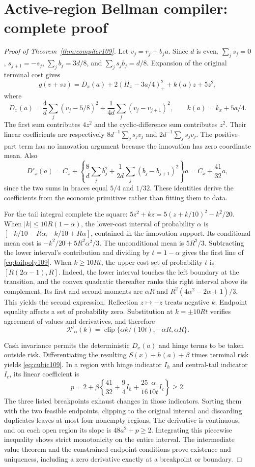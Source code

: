 \section{Active-region Bellman compiler: complete proof}\label{supp:compiler109}
\begin{proof}[Proof of Theorem~\ref{thm:compiler109}]
Let $v_j=r_j+b_ja$. Since $d$ is even, $\sum_js_j=0$, $s_{j+1}=-s_j$, $\sum_jb_j=3d/8$, and $\sum_js_jb_j=d/8$. Expansion of the original terminal cost gives
\[
 g(v+sz)=D_x(a)+2(H_x-3a/4)_+^2+k(a)z+5z^2,
\]
where
\[
 D_x(a)=\frac4d\sum_j(v_j-5/8)^2+\frac1{4d}\sum_j(v_j-v_{j+1})^2,
 \qquad k(a)=k_x+5a/4.
\]
The first sum contributes $4z^2$ and the cyclic-difference sum contributes $z^2$. Their linear coefficients are respectively $8d^{-1}\sum_js_jv_j$ and $2d^{-1}\sum_js_jv_j$. The positive-part term has no innovation argument because the innovation has zero coordinate mean. Also
\[
 D'_x(a)=C_x+\left\{\frac8d\sum_jb_j^2+\frac1{2d}\sum_j(b_j-b_{j+1})^2\right\}a
 =C_x+\frac{41}{32}a,
\]
since the two sums in braces equal $5/4$ and $1/32$. These identities derive the coefficients from the economic primitives rather than fitting them to data.

For the tail integral complete the square:
$5z^2+kz=5(z+k/10)^2-k^2/20$. When $|k|\le10R(1-\alpha)$, the lower-cost interval of probability $\alpha$ is
$[-k/10-R\alpha,-k/10+R\alpha]$, contained in the innovation support. Its conditional mean cost is $-k^2/20+5R^2\alpha^2/3$. The unconditional mean is $5R^2/3$. Subtracting the lower interval's contribution and dividing by $t=1-\alpha$ gives the first line of \eqref{eq:tailpoly109}. When $k\ge10Rt$, the upper-cost set of probability $t$ is $[R(2\alpha-1),R]$. Indeed, the lower interval touches the left boundary at the transition, and the convex quadratic thereafter ranks this right interval above its complement. Its first and second moments are $\alpha R$ and $R^2(4\alpha^2-2\alpha+1)/3$. This yields the second expression. Reflection $z\mapsto-z$ treats negative $k$. Endpoint equality affects a set of probability zero. Substitution at $k=\pm10Rt$ verifies agreement of values and derivatives, and therefore
\[
 \mathcal R'_\alpha(k)=\operatorname{clip}\{\alpha k/(10t),-\alpha R,\alpha R\}.
\]

Cash invariance permits the deterministic $D_x(a)$ and hinge terms to be taken outside risk. Differentiating the resulting $S(x)+h(a)+\beta$ times terminal risk yields \eqref{eq:cubic109}. In a region with hinge indicator $I_h$ and central-tail indicator $I_c$, its linear coefficient is
\[
 p=2+\beta\left\{\frac{41}{32}+\frac94 I_h+\frac{25}{16}\frac{\alpha}{10t}I_c\right\}\ge2.
\]
The three listed breakpoints exhaust changes in those indicators. Sorting them with the two feasible endpoints, clipping to the original interval and discarding duplicates leaves at most four nonempty regions. The derivative is continuous, and on each open region its slope is $48a^2+p\ge2$. Integrating this piecewise inequality shows strict monotonicity on the entire interval. The intermediate value theorem and the constrained endpoint conditions prove existence and uniqueness, including a zero derivative exactly at a breakpoint or boundary.


\end{proof}
